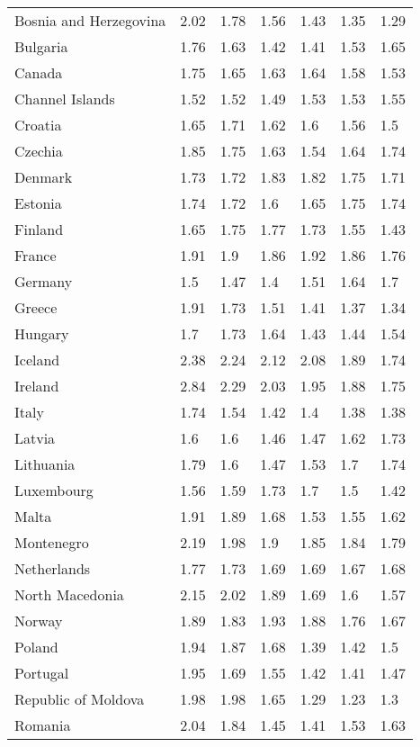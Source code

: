 \begin{longtable}[t]{lllllll}
Bosnia and Herzegovina & 2.02 & 1.78 & 1.56 & 1.43 & 1.35 & 1.29\\
Bulgaria & 1.76 & 1.63 & 1.42 & 1.41 & 1.53 & 1.65\\
Canada & 1.75 & 1.65 & 1.63 & 1.64 & 1.58 & 1.53\\
Channel Islands & 1.52 & 1.52 & 1.49 & 1.53 & 1.53 & 1.55\\
Croatia & 1.65 & 1.71 & 1.62 & 1.6 & 1.56 & 1.5\\
Czechia & 1.85 & 1.75 & 1.63 & 1.54 & 1.64 & 1.74\\
Denmark & 1.73 & 1.72 & 1.83 & 1.82 & 1.75 & 1.71\\
Estonia & 1.74 & 1.72 & 1.6 & 1.65 & 1.75 & 1.74\\
Finland & 1.65 & 1.75 & 1.77 & 1.73 & 1.55 & 1.43\\
France & 1.91 & 1.9 & 1.86 & 1.92 & 1.86 & 1.76\\
Germany & 1.5 & 1.47 & 1.4 & 1.51 & 1.64 & 1.7\\
Greece & 1.91 & 1.73 & 1.51 & 1.41 & 1.37 & 1.34\\
Hungary & 1.7 & 1.73 & 1.64 & 1.43 & 1.44 & 1.54\\
Iceland & 2.38 & 2.24 & 2.12 & 2.08 & 1.89 & 1.74\\
Ireland & 2.84 & 2.29 & 2.03 & 1.95 & 1.88 & 1.75\\
Italy & 1.74 & 1.54 & 1.42 & 1.4 & 1.38 & 1.38\\
Latvia & 1.6 & 1.6 & 1.46 & 1.47 & 1.62 & 1.73\\
Lithuania & 1.79 & 1.6 & 1.47 & 1.53 & 1.7 & 1.74\\
Luxembourg & 1.56 & 1.59 & 1.73 & 1.7 & 1.5 & 1.42\\
Malta & 1.91 & 1.89 & 1.68 & 1.53 & 1.55 & 1.62\\
Montenegro & 2.19 & 1.98 & 1.9 & 1.85 & 1.84 & 1.79\\
Netherlands & 1.77 & 1.73 & 1.69 & 1.69 & 1.67 & 1.68\\
North Macedonia & 2.15 & 2.02 & 1.89 & 1.69 & 1.6 & 1.57\\
Norway & 1.89 & 1.83 & 1.93 & 1.88 & 1.76 & 1.67\\
Poland & 1.94 & 1.87 & 1.68 & 1.39 & 1.42 & 1.5\\
Portugal & 1.95 & 1.69 & 1.55 & 1.42 & 1.41 & 1.47\\
Republic of Moldova & 1.98 & 1.98 & 1.65 & 1.29 & 1.23 & 1.3\\
Romania & 2.04 & 1.84 & 1.45 & 1.41 & 1.53 & 1.63\\

\end{longtable}
